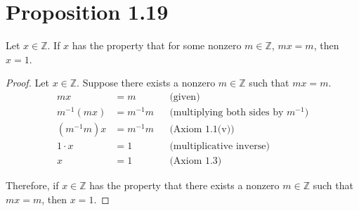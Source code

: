 \section*{Proposition 1.19}
Let $x \in \mathbb{Z}$. If $x$ has the property that for some nonzero $m \in \mathbb{Z}$, $mx = m$, then $x = 1$.
\begin{proof}
    Let $x \in \mathbb{Z}$. Suppose there exists a nonzero $m \in \mathbb{Z}$ such that $mx = m$.
    \begin{align*}
        mx         & = m       &  & \text{(given)}                              \\
        m^{-1}(mx) & = m^{-1}m &  & \text{(multiplying both sides by $m^{-1}$)} \\
        (m^{-1}m)x & = m^{-1}m &  & \text{(Axiom 1.1(v))}                       \\
        1 \cdot x  & = 1       &  & \text{(multiplicative inverse)}             \\
        x          & = 1       &  & \text{(Axiom 1.3)}
    \end{align*}

    Therefore, if $x \in \mathbb{Z}$ has the property that there exists a nonzero $m \in \mathbb{Z}$ such that $mx = m$, then $x = 1$.
\end{proof}


